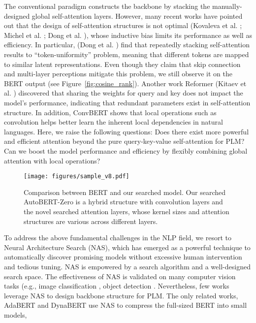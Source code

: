 \documentclass[letterpaper]{article} \usepackage{aaai22}  \usepackage{times}  \usepackage{helvet}  \usepackage{courier}  \usepackage[hyphens]{url}  \usepackage{graphicx} \urlstyle{rm} \def\UrlFont{\rm}  \usepackage{natbib}  \usepackage{caption} \DeclareCaptionStyle{ruled}{labelfont=normalfont,labelsep=colon,strut=off} \frenchspacing  \setlength{\pdfpagewidth}{8.5in}  \setlength{\pdfpageheight}{11in}  \usepackage{algorithm}
\begin{document}
The conventional paradigm constructs the backbone by stacking the manually-designed global self-attention layers. However, many recent works have pointed out that the design of self-attention structures is not optimal
(Kovaleva et al. \citeyear{kovaleva2019revealing}; Michel et al. \citeyear{michel2019sixteen}; Dong et al. \citeyear{dong2021attentionnot}), whose inductive bias limits its performance as well as efficiency. 
In particular, (Dong et al. \citeyear{dong2021attentionnot}) find that repeatedly stacking self-attention results to ``token-uniformity'' problem, meaning that different tokens are mapped to similar latent representations. Even though they claim that skip connection and multi-layer perceptions mitigate this  problem, we still observe it on the BERT output (see Figure~\ref{fig:cosine_rank}). 
Another work Reformer (Kitaev et al. \citeyear{kitaev2020reformer}) discovered that sharing the weights for query and key does not impact the model’s performance, indicating that redundant parameters exist in self-attention structure. In addition, ConvBERT \citep{jiang2020convbert} shows that local operations such as convolution helps better learn the inherent local dependencies in natural languages. Here, we raise the following questions: Does there exist more powerful and efficient attention beyond the pure query-key-value self-attention for PLM? Can we boost the model performance and efficiency by flexibly combining global attention with local operations?

\begin{figure}[t]
\centering
\texttt{[image: figures/sample\_v8.pdf]}
\caption{\small{Comparison between BERT and our searched model. Our searched AutoBERT-Zero is a hybrid structure with convolution layers and the novel searched attention layers, whose kernel sizes and attention structures are various across different layers.}}
	\label{fig:archs_compare}
	\vspace{-8mm}
\end{figure}
To address the above fundamental challenges in the NLP field, we resort to Neural Architecture Search (NAS), which has emerged as a powerful technique to automatically discover promising models without excessive human intervention and tedious tuning. NAS is empowered by a search algorithm and a well-designed search space. 
The effectiveness of NAS is validated on many computer vision tasks (e.g., image classification \citep{zoph2016neural, shi2020bridging},
object detection 
\citep{xu2019auto,yao2021jointdetnas}
. Nevertheless, few works leverage NAS to design backbone structure for PLM. The only related works, AdaBERT \citep{2020-adabert} and DynaBERT \citep{DBLP:conf/NeurIPS/HouHSJCL20} use NAS to compress the full-sized BERT into small models, 
\end{document}
